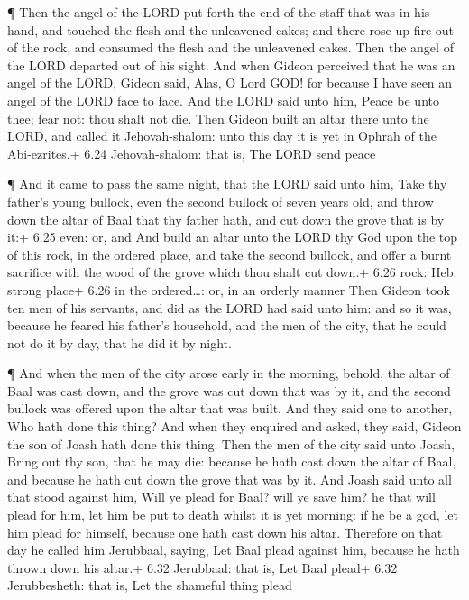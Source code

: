  ¶ Then the angel of the LORD put forth the end of the
staff that was in his hand, and touched the flesh and the unleavened
cakes; and there rose up fire out of the rock, and consumed the flesh
and the unleavened cakes. Then the angel of the LORD departed out of his
sight.  And when Gideon perceived that he was an angel of
the LORD, Gideon said, Alas, O Lord GOD! for because I have seen an
angel of the LORD face to face.  And the LORD said unto
him, Peace be unto thee; fear not: thou shalt not die. 
Then Gideon built an altar there unto the LORD, and called it
Jehovah-shalom: unto this day it is yet in Ophrah of the Abi-ezrites.+
6.24 Jehovah-shalom: that is, The LORD send peace

 ¶ And it came to pass the same night, that the LORD said
unto him, Take thy father's young bullock, even the second bullock of
seven years old, and throw down the altar of Baal that thy father hath,
and cut down the grove that is by it:+ 6.25 even: or, and 
And build an altar unto the LORD thy God upon the top of this rock, in
the ordered place, and take the second bullock, and offer a burnt
sacrifice with the wood of the grove which thou shalt cut down.+ 6.26
rock: Heb. strong place+ 6.26 in the ordered\ldots: or, in an orderly
manner  Then Gideon took ten men of his servants, and did
as the LORD had said unto him: and so it was, because he feared his
father's household, and the men of the city, that he could not do it by
day, that he did it by night.

 ¶ And when the men of the city arose early in the morning,
behold, the altar of Baal was cast down, and the grove was cut down that
was by it, and the second bullock was offered upon the altar that was
built.  And they said one to another, Who hath done this
thing? And when they enquired and asked, they said, Gideon the son of
Joash hath done this thing.  Then the men of the city said
unto Joash, Bring out thy son, that he may die: because he hath cast
down the altar of Baal, and because he hath cut down the grove that was
by it.  And Joash said unto all that stood against him,
Will ye plead for Baal? will ye save him? he that will plead for him,
let him be put to death whilst it is yet morning: if he be a god, let
him plead for himself, because one hath cast down his altar.
 Therefore on that day he called him Jerubbaal, saying, Let
Baal plead against him, because he hath thrown down his altar.+ 6.32
Jerubbaal: that is, Let Baal plead+ 6.32 Jerubbesheth: that is, Let the
shameful thing plead

